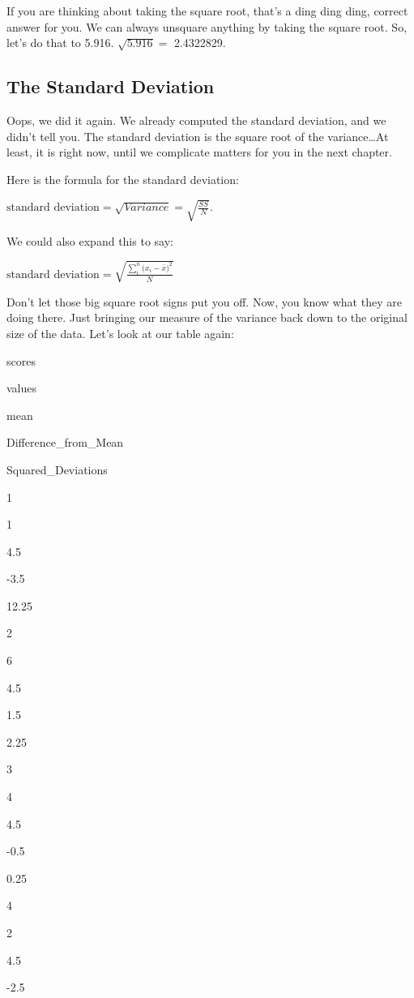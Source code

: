\documentclass[]{book}
\begin{document}
If you are thinking about taking the square root, that's a ding ding ding, correct answer for you. We can always unsquare anything by taking the square root. So, let's do that to 5.916. \(\sqrt{5.916} =\) 2.4322829.

\hypertarget{the-standard-deviation}{%
\subsection{The Standard Deviation}\label{the-standard-deviation}}

Oops, we did it again. We already computed the standard deviation, and we didn't tell you. The standard deviation is the square root of the variance\ldots{}At least, it is right now, until we complicate matters for you in the next chapter.

Here is the formula for the standard deviation:

\(\text{standard deviation} = \sqrt{Variance} = \sqrt{\frac{SS}{N}}\).

We could also expand this to say:

\(\text{standard deviation} = \sqrt{\frac{\sum_{i}^{n}({x_{i}-\bar{x})^2}}{N}}\)

Don't let those big square root signs put you off. Now, you know what they are doing there. Just bringing our measure of the variance back down to the original size of the data. Let's look at our table again:

scores

values

mean

Difference\_from\_Mean

Squared\_Deviations

1

1

4.5

-3.5

12.25

2

6

4.5

1.5

2.25

3

4

4.5

-0.5

0.25

4

2

4.5

-2.5
\end{document}

